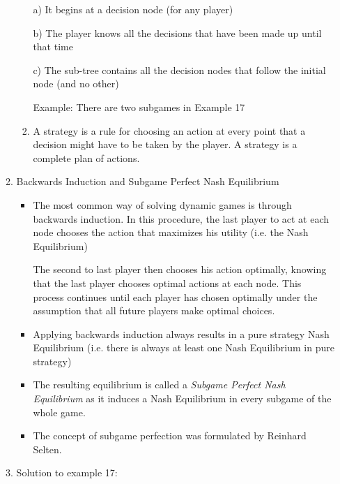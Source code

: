 \begin{enumerate}[a)]
\begin{enumerate}[c1)]
\begin{enumerate}[(1)]
                        a) It begins at a decision node (for any player)

                        b) The player knows all the decisions that have been
                            made up until that time

                        c) The sub-tree contains all the decision nodes that
                            follow the initial node (and no other)
                            
                        Example: There are two subgames in Example 17
                    \item A strategy is a rule for choosing an action at every point
                        that a decision might have to be taken by the player. A strategy
                        is a complete plan of actions.
                \end{enumerate}
            \item Backwards Induction and Subgame Perfect Nash Equilibrium
                \begin{itemize}
                    \item The most common way of solving dynamic games is through
                        backwards induction. In this procedure, the last player
                        to act at each node chooses the action that maximizes
                        his utility (i.e. the Nash Equilibrium)

                        The second to last player then chooses his action optimally,
                        knowing that the last player chooses optimal actions at each
                        node. This process continues until each player has chosen
                        optimally under the assumption that all future players
                        make optimal choices.
                    \item Applying backwards induction always results in a pure
                        strategy Nash Equilibrium (i.e. there is always at least
                        one Nash Equilibrium in pure strategy)
                    \item The resulting equilibrium is called a \textit{Subgame
                        Perfect Nash Equilibrium} as it induces a Nash Equilibrium
                        in every subgame of the whole game.
                    \item The concept of subgame perfection was formulated by Reinhard
                        Selten.
                \end{itemize}
            \item Solution to example 17:
                

\end{enumerate}
\end{enumerate}
